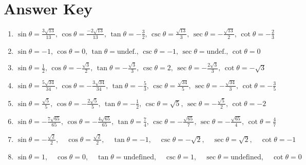 \newpage

\section{Answer Key}

\begin{enumerate}
	\item $\sin\theta = \frac{3\sqrt{13}}{13}, \, \cos\theta = \frac{-2\sqrt{13}}{13}, \, \tan\theta = -\frac{3}{2}, \, \csc\theta = \frac{\sqrt{13}}{3}, \, \sec\theta = -\frac{\sqrt{13}}{2}, \, \cot\theta = -\frac{2}{3}$

    \item $\sin\theta = -1, \, \cos\theta = 0, \, \tan\theta = \text{undef.}, \, \csc\theta = -1, \, \sec\theta = \text{undef.}, \, \cot\theta = 0$
    
    \item $\sin\theta = \frac{1}{2}, \, \cos\theta = -\frac{\sqrt{3}}{2}, \, \tan\theta = -\frac{\sqrt{3}}{3}, \, \csc\theta = 2, \, \sec\theta = -\frac{2\sqrt{3}}{3}, \, \cot\theta = -\sqrt{3}$
    
    \item $\sin \theta = \frac{5\sqrt{34}}{34}, \, \cos\theta = -\frac{3\sqrt{34}}{34}, \, \tan\theta = -\frac{5}{3}, \, \csc\theta = \frac{\sqrt{34}}{5}, \, \sec\theta = -\frac{\sqrt{34}}{3}, \, \cot\theta=-\frac{3}{5}$
    
     \item $\sin \theta = \frac{\sqrt{5}}{5}, \, \cos\theta = -\frac{2\sqrt{5}}{5}, \, \tan\theta = -\frac{1}{2}, \, \csc\theta = \sqrt{5}, \, \sec\theta = -\frac{\sqrt{5}}{2}, \, \cot\theta=-2$
    
     \item $\sin \theta = -\frac{7\sqrt{65}}{65}, \, \cos\theta = -\frac{4\sqrt{65}}{65}, \, \tan\theta = \frac{7}{4}, \, \csc\theta = -\frac{\sqrt{65}}{7}, \, \sec\theta = -\frac{\sqrt{65}}{4}, \, \cot\theta= \frac{4}{7}$
     
    
    \item $\sin\theta = -\frac{\sqrt{2}}{2}, \quad \cos\theta = \frac{\sqrt{2}}{2}, \quad \tan\theta = -1, \quad \csc\theta = -\sqrt{2}, \quad \sec\theta = \sqrt{2}, \quad \cot\theta = -1$
    
    \item $\sin\theta = 1, \quad \cos\theta = 0, \quad \tan\theta = \text{undefined}, \quad \csc\theta = 1, \quad \sec\theta = \text{undefined}, \quad \cot\theta = 0$
    

\end{enumerate}
